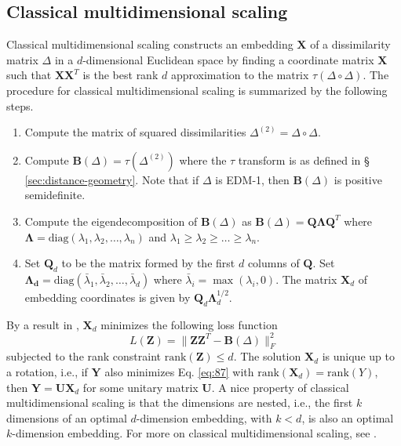 \subsection{Classical multidimensional scaling}
\label{sec:classical-mds}
Classical multidimensional scaling \citep{torgesen52:_multid,gower66:_some}
constructs an embedding $\mathbf{X}$ of a dissimilarity matrix
$\Delta$ in a $d$-dimensional Euclidean space by finding a coordinate matrix
$\mathbf{X}$ such that $\mathbf{X}\mathbf{X}^{T}$ is the best rank $d$
approximation to the matrix $\tau(\Delta \circ \Delta)$. The
procedure for classical multidimensional scaling is summarized by
the following steps.
\begin{enumerate}
\item Compute the matrix of squared dissimilarities $\Delta^{(2)} =
  \Delta \circ \Delta$.
\item Compute $\mathbf{B}(\Delta) = \tau(\Delta^{(2)})$ where the
  $\tau$ transform is as defined in \S
  \ref{sec:distance-geometry}. Note that if $\Delta$ is EDM-1, then
  $\mathbf{B}(\Delta)$ is positive semidefinite. 
\item Compute the eigendecomposition of $\mathbf{B}(\Delta)$ as
  $\mathbf{B}(\Delta) = \mathbf{Q} \bm{\Lambda} \mathbf{Q}^{T}$ where
  $\bm{\Lambda} = \mathrm{diag}(\lambda_1, \lambda_2, \dots,
  \lambda_n)$ and $\lambda_1 \geq \lambda_2 \geq \dots \geq
  \lambda_n$.  
\item Set $\mathbf{Q}_d$ to be the matrix formed by the first $d$
  columns of $\mathbf{Q}$. Set $\bm{\Lambda_{d}} =
  \mathrm{diag}(\bar{\lambda}_1,\bar{\lambda}_2, \dots,
  \bar{\lambda}_d)$ where $\bar{\lambda}_i = \max(\lambda_i, 0)$. The
  matrix $\mathbf{X}_d$ of embedding coordinates is given by
  $\mathbf{Q}_d \mathbf{\Lambda}_{d}^{1/2}$.
\end{enumerate}
 By a result in \citet{eckart36:_approx}, $\mathbf{X}_d$ minimizes the
following loss function
\begin{equation}
  \label{eq:87}
 L(\mathbf{Z}) = \| \mathbf{Z} \mathbf{Z}^{T} - \mathbf{B}(\Delta)
 \|_F^{2} 
\end{equation}
subjected to the rank constraint $\mathrm{rank}(\mathbf{Z}) \leq
d$. The solution $\mathbf{X}_d$ is unique up to a rotation, i.e., if
$\mathbf{Y}$ also minimizes Eq. \eqref{eq:87} with
$\mathrm{rank}(\mathbf{X}_d) = \mathrm{rank}(Y)$, then $\mathbf{Y} =
\mathbf{U}\mathbf{X}_d$ for some unitary matrix $\mathbf{U}$. A nice
property of classical multidimensional scaling is that the dimensions
are nested, i.e., the first $k$ dimensions of an optimal $d$-dimension
embedding, with $k < d$, is also an optimal $k$-dimension
embedding. For more on classical multidimensional scaling, see
\citet{borg05:_moder}.
%
%


